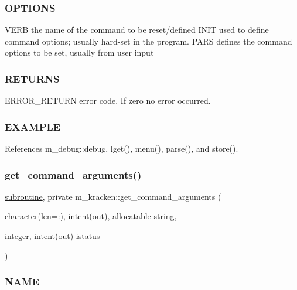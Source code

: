 \subsubsection*{O\+P\+T\+I\+O\+NS}

V\+E\+RB the name of the command to be reset/defined I\+N\+IT used to define command options; usually hard-\/set in the program. P\+A\+RS defines the command options to be set, usually from user input

\subsubsection*{R\+E\+T\+U\+R\+NS}

E\+R\+R\+O\+R\+\_\+\+R\+E\+T\+U\+RN error code. If zero no error occurred.

\subsubsection*{E\+X\+A\+M\+P\+LE}

References m\+\_\+debug\+::debug, lget(), menu(), parse(), and store().

\mbox{\label{namespacem__kracken_a4c509f8594be3b73928c43c961c1caf4}} 
\subsubsection{\texorpdfstring{get\+\_\+command\+\_\+arguments()}{get\_command\_arguments()}}
{\footnotesize\ttfamily \hyperlink{M__stopwatch_83_8txt_acfbcff50169d691ff02d4a123ed70482}{subroutine}, private m\+\_\+kracken\+::get\+\_\+command\+\_\+arguments (\begin{DoxyParamCaption}\item[{\hyperlink{option__stopwatch_83_8txt_abd4b21fbbd175834027b5224bfe97e66}{character}(len=\+:), intent(out), allocatable}]{string,  }\item[{integer, intent(out)}]{istatus }\end{DoxyParamCaption})\hspace{0.3cm}{\ttfamily [private]}}



\subsubsection*{N\+A\+ME}


